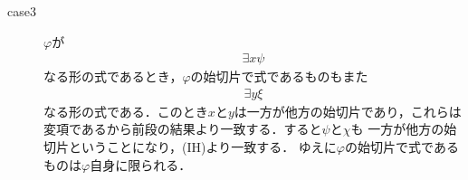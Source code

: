 \begin{metaprf}
\begin{description}
\begin{description}
					\item[case3] $\varphi$が
						\begin{align}
							\exists x \psi
						\end{align}
						なる形の式であるとき，$\varphi$の始切片で式であるものもまた
						\begin{align}
							\exists y \xi
						\end{align}
						なる形の式である．このとき$x$と$y$は一方が他方の始切片であり，これらは
						変項であるから前段の結果より一致する．すると$\psi$と$\chi$も
						一方が他方の始切片ということになり，(IH)より一致する．
						ゆえに$\varphi$の始切片で式であるものは$\varphi$自身に限られる．
						\QED
				\end{description}
		\end{description}
	\end{metaprf}
	
